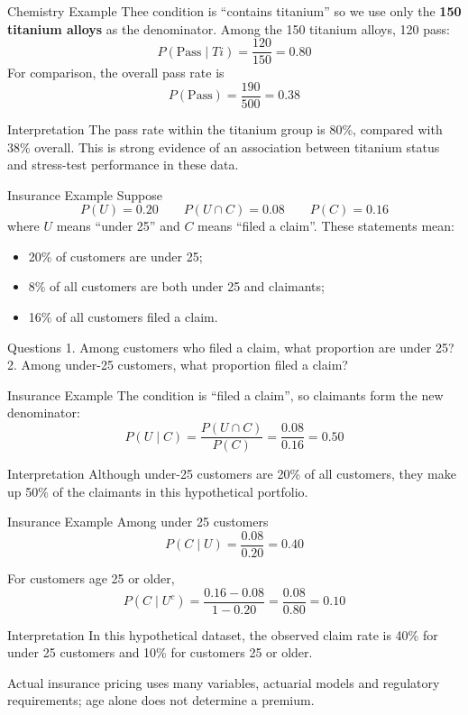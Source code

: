 \documentclass[aspectratio=169]{beamer}
\begin{document}
\begin{frame}{Chemistry Example}
Thee condition is ``contains titanium'' so we use only the \textbf{150 titanium alloys} as the denominator. Among the 150 titanium alloys, 120 pass:
$$ P(\text{Pass}\mid Ti)=\frac{120}{150}=\mathbf{0.80}$$
For comparison, the overall pass rate is
$$P(\text{Pass})=\frac{190}{500}=\mathbf{0.38}$$

\begin{block}{Interpretation}
The pass rate within the titanium group is 80\%, compared with 38\% overall. This is strong evidence of an association between titanium status and stress-test performance in these data.
\end{block}
\end{frame}

\begin{frame}{Insurance Example}
Suppose
$$P(U)=0.20\qquad P(U\cap C)=0.08\qquad P(C)=0.16$$
where $U$ means ``under 25'' and $C$ means ``filed a claim''.
\vspace{0.15cm}
These statements mean:
\begin{itemize}
	\item 20\% of customers are under 25;
	\item 8\% of all customers are both under 25 and claimants;
	\item 16\% of all customers filed a claim.
\end{itemize}

\begin{block}{Questions}
1. Among customers who filed a claim, what proportion are under 25?\\
2. Among under-25 customers, what proportion filed a claim?
\end{block}
\end{frame}

\begin{frame}{Insurance Example}
The condition is ``filed a claim'', so claimants form the new denominator:
\[
	P(U\mid C)=\frac{P(U\cap C)}{P(C)} =\frac{0.08}{0.16} =\mathbf{0.50}
\]
\begin{block}{Interpretation}
Although under-25 customers are 20\% of all customers, they make up 50\% of the claimants in this hypothetical portfolio.
\end{block}
\end{frame}

\begin{frame}{Insurance Example}
Among under 25 customers
$$P(C\mid U)=\frac{0.08}{0.20}=\mathbf{0.40}$$

For customers age 25 or older, 
\[
	P(C\mid U^c)=\frac{0.16-0.08}{1-0.20} =\frac{0.08}{0.80} =\mathbf{0.10}
\]

\begin{block}{Interpretation}
In this hypothetical dataset, the observed claim rate is 40\% for under 25 customers and 10\% for customers 25 or older.
\end{block}

\small Actual insurance pricing uses many variables, actuarial models and regulatory requirements; age alone does not determine a premium.
\end{frame}
\end{document}
